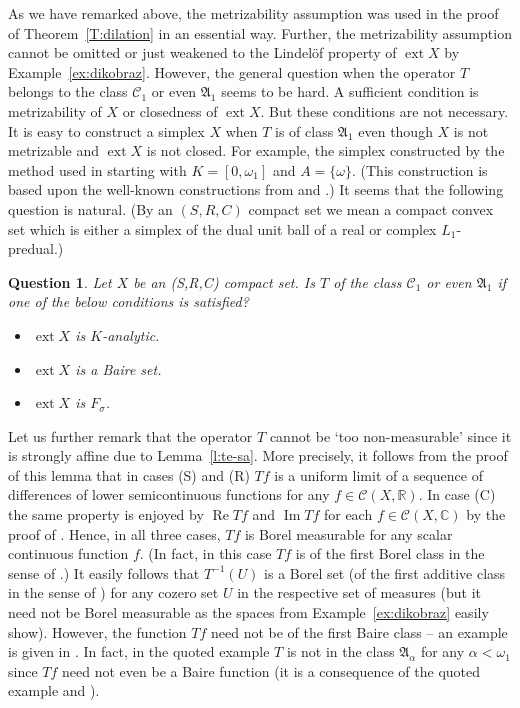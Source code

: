 \documentclass{amsart}
\numberwithin{equation}{section}
\newtheorem{question}[thm]{Question}
\theoremstyle{definition}
\def\fra{\mathfrak{A}}
\def\C{\mathcal C}
\def\ce{\mathbb C}
\def\er{\mathbb R}
\def \ext {\operatorname{ext}}
\renewcommand{\Re}{\operatorname{Re}}
\renewcommand{\Im}{\operatorname{Im}}
\begin{document}
As we have remarked above, the metrizability assumption was used in the proof of Theorem~\ref{T:dilation} in an essential way.
Further, the metrizability assumption cannot be omitted or just weakened to the Lindel\"of property of $\ext X$ by Example~\ref{ex:dikobraz}. However, the general question when the operator $T$ belongs to the class $\C_1$ or even $\fra_1$ seems to be hard. A sufficient condition is metrizability of $X$ or closedness of $\ext X$. But these conditions are not necessary. It is easy to construct a simplex $X$ when $T$ is of class $\fra_1$ even though $X$ is not metrizable and $\ext X$ is not closed. For example, the simplex constructed by the method used in \cite[Theorem 4]{kalenda-bpms} starting with
$K=[0,\omega_1]$ and $A=\{\omega\}$. (This construction is based upon the well-known constructions from \cite{stacey} and \cite{bi-de-le}.) It seems that the following question is natural. (By an $(S,R,C)$ compact set we mean a compact convex set which is either a simplex of the dual unit ball of a real or complex $L_1$-predual.)

\begin{question}\label{q:kan} Let $X$ be an (S,R,C) compact set. Is $T$ of the class $\C_1$ or even $\fra_1$ if one of the below conditions is satisfied?
\begin{itemize}
	\item $\ext X$ is $K$-analytic.
	\item $\ext X$ is a Baire set.
	\item $\ext X$ is $F_\sigma$.
\end{itemize}
\end{question}

Let us further remark that the operator $T$ cannot be `too non-measurable' since it is strongly affine due to Lemma~\ref{l:te-sa}. More precisely, it follows from the proof of this lemma that in cases (S) and (R) $Tf$ is a uniform limit of a sequence of differences of lower semicontinuous functions for any $f\in\C(X,\er)$.
In case (C) the same property is enjoyed by $\Re Tf$ and $\Im Tf$ for each $f\in\C(X,\ce)$ by the proof of \cite[Lemma 4.12]{petracek-spurny}. Hence, in all three cases, $Tf$ is Borel measurable for any scalar continuous function $f$. (In fact, in this case $Tf$ is of the first Borel class in the sense of \cite{spurny-amh}.) It easily follows that $T^{-1}(U)$ is a Borel set (of the first additive class in the sense of \cite{spurny-amh}) for any cozero set $U$ in the respective set of measures (but it need not be Borel measurable as the spaces from Example~\ref{ex:dikobraz} easily show).
However, the function $Tf$ need not be of the first Baire class -- an example is given in \cite[Theorem 4]{kalenda-bpms}.
In fact, in the quoted example $T$ is not in the class $\fra_\alpha$ for any $\alpha<\omega_1$ since $Tf$ need not even be a Baire function (it is a consequence of the quoted example and \cite[Theorem 5]{kalenda-bpms}).
\end{document}
